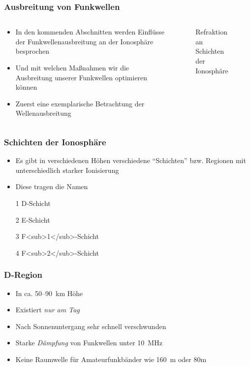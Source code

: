 \begin{frame}
\frametitle{Ausbreitung von Funkwellen}
\begin{columns}
    \begin{column}{0.48\textwidth}
    \begin{itemize}
  \item In den kommenden Abschnitten werden Einflüsse der Funkwellenausbreitung an der Ionosphäre besprochen
  \item Und mit welchen Maßnahmen wir die Ausbreitung unserer Funkwellen optimieren können
  \item Zuerst eine exemplarische Betrachtung der Wellenausbreitung
  \end{itemize}

    \end{column}
   \begin{column}{0.48\textwidth}
       
\begin{figure}
    \caption{\scriptsize Refraktion an Schichten der Ionosphäre}
    \label{e_wellenausbreitung_refraktion}
\end{figure}


   \end{column}
\end{columns}

\end{frame}

\begin{frame}\end{frame}

\begin{frame}
\frametitle{Schichten der Ionosphäre}
\begin{itemize}
  \item Es gibt in verschiedenen Höhen verschiedene \enquote{Schichten} bzw. Regionen mit unterschiedlich starker Ionisierung
  \item Diese tragen die Namen
  \end{itemize}
\begin{enumerate}
  \item[1] D-Schicht
  \item[2] E-Schicht
  \item[3] F<sub>1</sub>-Schicht
  \item[4] F<sub>2</sub>-Schicht
  \end{enumerate}
\end{frame}

\begin{frame}
\frametitle{D-Region}
\begin{itemize}
  \item In ca. 50–\qty{90}{\kilo\metre} Höhe
  \item Existiert \emph{nur am Tag}
  \item Nach Sonnenuntergang sehr schnell verschwunden
  \item Starke \emph{Dämpfung} von Funkwellen unter \qty{10}{\mega\hertz}
  \item Keine Raumwelle für Amateurfunkbänder wie \qty{160}{\metre} oder 80m
  \end{itemize}

\end{frame}


